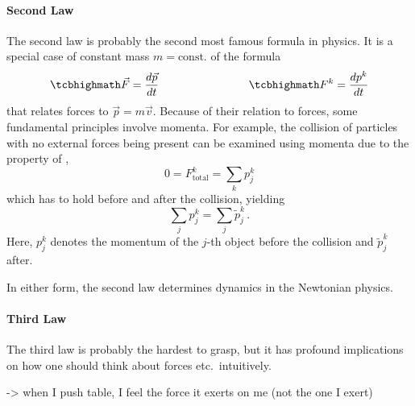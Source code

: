 \documentclass[../relativity_main.tex]{subfiles}
\begin{document}
			\paragraph{Second Law}
The second law is probably the second most famous formula in physics. It is a special case of constant mass $m = \text{const.}$ of the formula
\begin{equation}\label{eq:newton_2}
	\eqbox{
	\vec{F} = \dv{\vec{p}}{t}
	}
	\manyqquad
	\eqbox{
	F^k = \dv{p^k}{t}
	}
\end{equation}
that relates forces to  $\vec{p} = m \vec{v}$. Because of their relation to forces, some fundamental principles involve momenta. For example, the collision of particles with no external forces being present can be examined using momenta due to the property of ,
\begin{equation}\label{eq:momentum_conservation}
	0 = F_\text{total}^k = \sum_k p_j^k
\end{equation}
which has to hold before and after the collision, yielding
\begin{equation}\label{eq:implication_momentum_conservation}
	\sum_j p_j^k = \sum_j \tilde{p}_j^k \, .
\end{equation}
Here, $p_j^k$ denotes the momentum of the $j$-th object before the collision and $\tilde{p}_j^k$ after.


In either form, the second law determines dynamics in the Newtonian physics.



			\paragraph{Third Law}
The third law is probably the hardest to grasp, but it has profound implications on how one should think about forces etc.~intuitively.

-> when I push table, I feel the force it exerts on me (not the one I exert)
\end{document}

